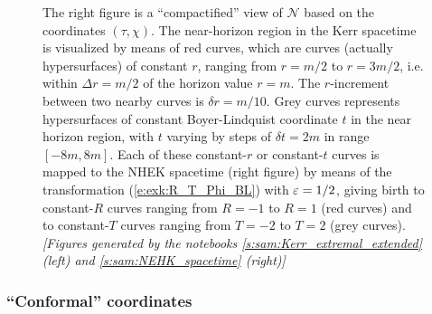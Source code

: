 \begin{figure}
{The right figure is a ``compactified'' view of $\mathscr{N}$
based on the coordinates $(\tau,\chi)$. The near-horizon region in
the Kerr spacetime is visualized by means of red curves, which
are curves (actually hypersurfaces) of constant $r$,
ranging from $r=m/2$ to $r=3m/2$, i.e. within $\Delta r = m/2$ of the horizon value $r=m$.
The $r$-increment between two nearby curves is $\delta r = m/10$.
Grey curves represents hypersurfaces of constant Boyer-Lindquist coordinate $t$
in the near horizon region, with $t$ varying by steps of $\delta t = 2m$
in range $[-8m, 8m]$. Each of these constant-$r$ or constant-$t$ curves is mapped
to the NHEK spacetime (right figure) by means of the transformation
(\ref{e:exk:R_T_Phi_BL}) with $\varepsilon=1/2$, giving birth to constant-$R$
curves ranging from $R=-1$ to $R=1$ (red curves) and to constant-$T$
curves ranging from $T=-2$ to $T=2$ (grey curves).
\textsl{[Figures generated by the notebooks \ref{s:sam:Kerr_extremal_extended} (left)
and \ref{s:sam:NEHK_spacetime} (right)]}
}
\end{figure}



\subsubsection{``Conformal'' coordinates}

